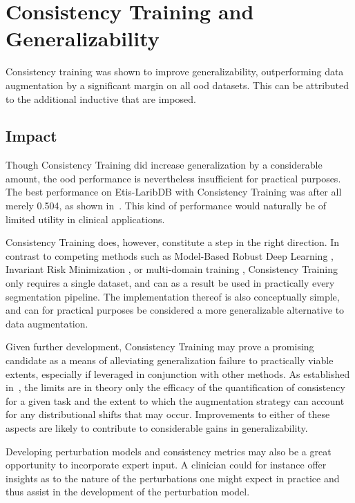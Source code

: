 \section{Consistency Training and Generalizability}
Consistency training was shown to improve generalizability, outperforming data augmentation by a significant margin on all \gls{ood} datasets. This can be attributed to the additional inductive that are imposed.  
        
    \subsection{Impact}
    Though Consistency Training did increase generalization by a considerable amount, the \gls{ood} performance is nevertheless insufficient for practical purposes. The best performance on Etis-LaribDB with Consistency Training was after all merely 0.504, as shown in~. This kind of performance would naturally be of limited utility in clinical applications.
    
    Consistency Training does, however, constitute a step in the right direction. In contrast to competing methods such as Model-Based Robust Deep Learning \cite{modelbased}, Invariant Risk Minimization \cite{IRM}, or multi-domain training \cite{generalization_datamod}, Consistency Training only requires a single dataset, and can as a result be used in practically every segmentation pipeline. The implementation thereof is also conceptually simple, and can for practical purposes be considered a more generalizable alternative to data augmentation. 
    
    Given further development, Consistency Training may prove a promising candidate as a means of alleviating generalization failure to practically viable extents, especially if leveraged in conjunction with other methods. As established in~, the limits are in theory only the efficacy of the quantification of consistency for a given task and the extent to which the augmentation strategy can account for any distributional shifts that may occur. Improvements to either of these aspects are likely to contribute to considerable gains in generalizability. 
    
    Developing perturbation models and consistency metrics may also be a great opportunity to incorporate expert input. A clinician could for instance offer insights as to the nature of the perturbations one might expect in practice and thus assist in the development of the perturbation model.
    
